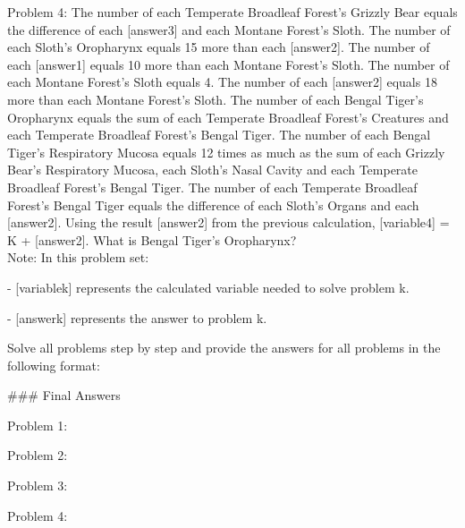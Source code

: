 \begin{systemprompt}[title={Question}]
Problem 4: The number of each Temperate Broadleaf Forest's Grizzly Bear equals the difference of each [answer3] and each Montane Forest's Sloth. The number of each Sloth's Oropharynx equals 15 more than each [answer2]. The number of each [answer1] equals 10 more than each Montane Forest's Sloth. The number of each Montane Forest's Sloth equals 4. The number of each [answer2] equals 18 more than each Montane Forest's Sloth. The number of each Bengal Tiger's Oropharynx equals the sum of each Temperate Broadleaf Forest's Creatures and each Temperate Broadleaf Forest's Bengal Tiger. The number of each Bengal Tiger's Respiratory Mucosa equals 12 times as much as the sum of each Grizzly Bear's Respiratory Mucosa, each Sloth's Nasal Cavity and each Temperate Broadleaf Forest's Bengal Tiger. The number of each Temperate Broadleaf Forest's Bengal Tiger equals the difference of each Sloth's Organs and each [answer2]. Using the result [answer2] from the previous calculation, [variable4] = K + [answer2]. What is Bengal Tiger's Oropharynx?\\

Note: In this problem set:

- [variablek] represents the calculated variable needed to solve problem k.

- [answerk] represents the answer to problem k.

Solve all problems step by step and provide the answers for all problems in the following format:

\#\#\# Final Answers

Problem 1: \boxed{[answer1]}

Problem 2: \boxed{[answer2]}

Problem 3: \boxed{[answer3]}

Problem 4: \boxed{[answer4]}

\end{systemprompt}




